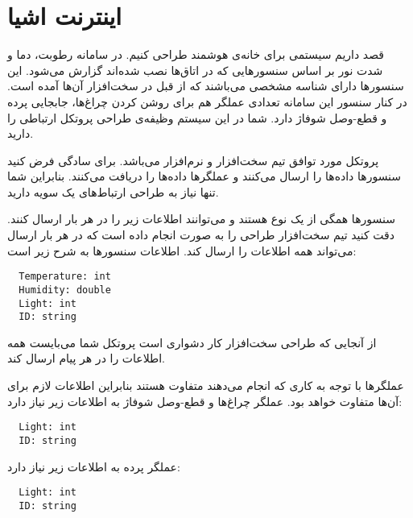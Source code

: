 \documentclass[../main.tex]{subfiles}
\begin{document}
\section{اینترنت اشیا}

قصد داریم سیستمی برای خانه‌ی هوشمند طراحی کنیم.
در سامانه رطوبت، دما و شدت نور بر اساس سنسورهایی که در اتاق‌ها نصب شده‌اند گزارش می‌شود.
این سنسورها دارای شناسه مشخصی می‌باشند که از قبل در سخت‌افزار آن‌ها آمده است.
در کنار سنسور این سامانه تعدادی عملگر هم برای روشن کردن چراغ‌ها، جابجایی پرده و قطع-وصل شوفاژ دارد.
شما در این سیستم وظیفه‌ی طراحی پروتکل ارتباطی را دارید.

پروتکل مورد توافق تیم سخت‌افزار و نرم‌افزار  می‌باشد. برای سادگی فرض کنید سنسورها داده‌ها را ارسال می‌کنند و عملگرها داده‌ها را دریافت می‌کنند.
بنابراین شما تنها نیاز به طراحی ارتباط‌های یک سویه دارید.

سنسورها همگی از یک نوع هستند و می‌توانند اطلاعات زیر را در هر بار ارسال کنند.
دقت کنید تیم سخت‌افزار طراحی را به صورت انجام داده است که در هر بار ارسال می‌تواند همه اطلاعات را ارسال کند.
اطلاعات سنسورها به شرح زیر است:

\begin{latin}\begin{lstlisting}
  Temperature: int
  Humidity: double
  Light: int
  ID: string
\end{lstlisting}\end{latin}

از آنجایی که طراحی سخت‌افزار کار دشواری است پروتکل شما می‌بایست همه اطلاعات را در هر پیام ارسال کند.

عملگرها با توجه به کاری که انجام می‌دهند متفاوت هستند بنابراین اطلاعات لازم برای آن‌ها متفاوت خواهد بود.
عملگر چراغ‌ها و قطع-وصل شوفاژ به اطلاعات زیر نیاز دارد:

\begin{latin}\begin{lstlisting}
  Light: int
  ID: string
\end{lstlisting}\end{latin}

عملگر پرده به اطلاعات زیر نیاز دارد:

\begin{latin}\begin{lstlisting}
  Light: int
  ID: string
\end{lstlisting}\end{latin}
\end{document}
